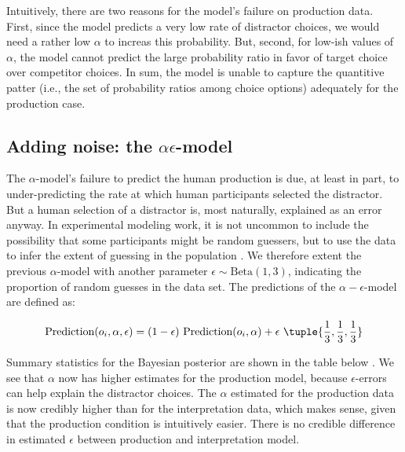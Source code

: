 \documentclass{article}
\begin{document}
Intuitively, there are two reasons for the model's failure on production data.
First, since the model predicts a very low rate of distractor choices, we would need a rather low \(\alpha\) to increas this probability.
But, second, for low-ish values of \(\alpha\), the model cannot predict the large probability ratio in favor of target choice over competitor choices.
In sum, the model is unable to capture the quantitive patter (i.e., the set of probability ratios among choice options) adequately for the production case.


\subsection{Adding noise: the \(\alpha \epsilon\)-model}
\label{sec:adding-noise-the-alpha-epsilon-model}

The $\alpha$-model's  failure to predict the human production is due, at least in part, to under-predicting the rate at which human participants selected the distractor.
But a human selection of a distractor is, most naturally, explained as an error anyway.
In experimental modeling work, it is not uncommon to include the possibility that some participants might be random guessers, but to use the data to infer the extent of guessing in the population \citep{LeeWagenmakers2013:Bayesian-Cognit}.
We therefore extent the previous $\alpha$-model with another parameter \(\epsilon \sim \text{Beta}(1,3)\), indicating the proportion of random guesses in the data set.
The predictions of the $\alpha-\epsilon$-model are defined as:

\begin{align*}
  \text{Prediction}(o_i, \alpha, \epsilon) = (1-\epsilon) \ \text{Prediction}(o_i, \alpha) + \epsilon \ \tuple{\frac{1}{3}, \frac{1}{3}, \frac{1}{3}}
\end{align*}

Summary statistics for the Bayesian posterior are shown in the table below .
We see that \(\alpha\) now has higher estimates for the production model, because \(\epsilon\)-errors can help explain the distractor choices.
The \(\alpha\) estimated for the production data is now credibly higher than for the interpretation data, which makes sense, given that the production condition is intuitively easier.
There is no credible difference in estimated \(\epsilon\) between production and interpretation model.
\end{document}
